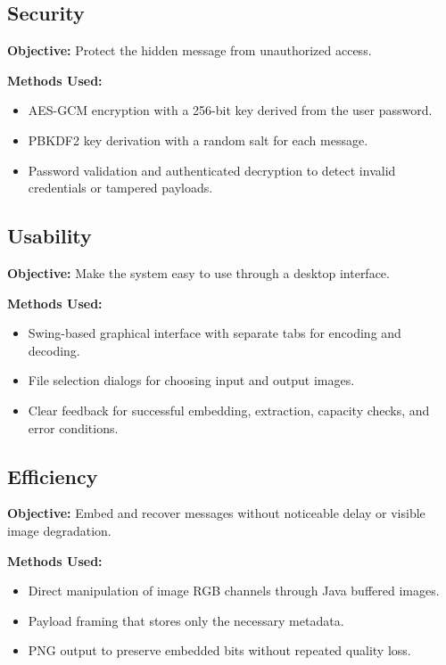 \documentclass[12pt]{report}
\begin{document}
\subsection{Security}
\textbf{Objective:} Protect the hidden message from unauthorized access.

\textbf{Methods Used:}
\begin{itemize}
    \item AES-GCM encryption with a 256-bit key derived from the user password.
    \item PBKDF2 key derivation with a random salt for each message.
    \item Password validation and authenticated decryption to detect invalid credentials or tampered payloads.
\end{itemize}

\subsection{Usability}
\textbf{Objective:} Make the system easy to use through a desktop interface.

\textbf{Methods Used:}
\begin{itemize}
    \item Swing-based graphical interface with separate tabs for encoding and decoding.
    \item File selection dialogs for choosing input and output images.
    \item Clear feedback for successful embedding, extraction, capacity checks, and error conditions.
\end{itemize}

\subsection{Efficiency}
\textbf{Objective:} Embed and recover messages without noticeable delay or visible image degradation.

\textbf{Methods Used:}
\begin{itemize}
    \item Direct manipulation of image RGB channels through Java buffered images.
    \item Payload framing that stores only the necessary metadata.
    \item PNG output to preserve embedded bits without repeated quality loss.
\end{itemize}
\end{document}

